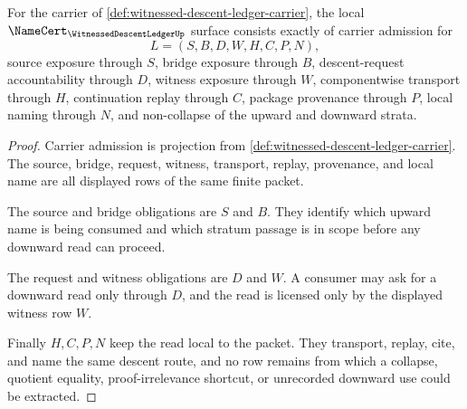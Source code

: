 \begin{theorem}
\label{thm:witnessed-descent-ledger-namecert-obligations}
For the carrier of \autoref{def:witnessed-descent-ledger-carrier}, the local $\NameCert_{\WitnessedDescentLedgerUp}$ surface consists exactly of carrier admission for
$$
L=(S,B,D,W,H,C,P,N),
$$
source exposure through $S$, bridge exposure through $B$, descent-request accountability through $D$, witness exposure through $W$, componentwise transport through $H$, continuation replay through $C$, package provenance through $P$, local naming through $N$, and non-collapse of the upward and downward strata.
\end{theorem}
\begin{proof}
Carrier admission is projection from \autoref{def:witnessed-descent-ledger-carrier}. The source, bridge, request, witness, transport, replay, provenance, and local name are all displayed rows of the same finite packet.

The source and bridge obligations are $S$ and $B$. They identify which upward name is being consumed and which stratum passage is in scope before any downward read can proceed.

The request and witness obligations are $D$ and $W$. A consumer may ask for a downward read only through $D$, and the read is licensed only by the displayed witness row $W$.

Finally $H,C,P,N$ keep the read local to the packet. They transport, replay, cite, and name the same descent route, and no row remains from which a collapse, quotient equality, proof-irrelevance shortcut, or unrecorded downward use could be extracted.
\end{proof}

